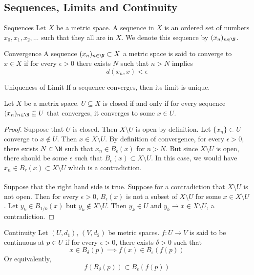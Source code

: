 \subsection{Sequences, Limits and Continuity}
\begin{defn}{Sequences}{} Let $X$ be a metric space. A sequence in $X$ is an ordered set of numbers $x_0,x_1,x_2,\dots$ such that they all are in $X$. We denote this sequence by $(x_n)_{n\in\N}$. 
\end{defn}

\begin{defn}{Convergence}{} A sequence $(x_n)_{n\in\N}\subset X$ a metric space is said to converge to $x\in X$ if for every $\epsilon>0$ there exists $N$ such that $n>N$ implies $$d(x_n,x)<\epsilon$$
\end{defn}

\begin{prp}{Uniqueness of Limit}{} If a sequence converges, then its limit is unique. 
\end{prp}

\begin{prp}{}{} Let $X$ be a metrix space. $U\subseteq X$ is closed if and only if for every sequence $(x_n)_{n\in\N}\subseteq U$ that converges, it converges to some $x\in U$. \tcbline
\begin{proof} Suppose that $U$ is closed. Then $X\setminus U$ is open by definition. Let $\{x_n\}\subset U$ converge to $x\notin U$. Then $x\in X\setminus U$. By definition of convergence, for every $\epsilon>0$, there exists $N\in\N$ such that $x_n\in B_\epsilon(x)$ for $n>N$. But since $X\setminus U$ is open, there should be some $\epsilon$ such that $B_\epsilon(x)\subset X\setminus U$. In this case, we would have $x_n\in B_r(x)\subset X\setminus U$ which is a contradiction. \\~\\
Suppose that the right hand side is true. Suppose for a contradiction that $X\setminus U$ is not open. Then for every $\epsilon>0$, $B_\epsilon(x)$ is not a subset of $X\setminus U$ for some $x\in X\setminus U$. Let $y_k\in B_{1/k}(x)$ but $y_k\notin X\setminus U$. Then $y_k\in U$ and $y_k\to x\in X\setminus U$, a contradiction. 
\end{proof}
\end{prp}

\begin{defn}{Continuity}{} Let $(U,d_1)$, $(V,d_2)$ be metric spaces. $f:U\to V$ is said to be continuous at $p\in U$ if for every $\epsilon>0$, there exists $\delta>0$ such that $$x\in B_{\delta}(p)\implies f(x)\in B_{\epsilon}(f(p))$$ Or equivalently, $$f(B_{\delta}(p))\subset B_{\epsilon}(f(p))$$
\end{defn}

